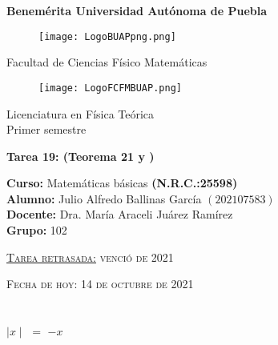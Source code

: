 \documentclass[12pt]{article}
\begin{document}
\pagestyle{empty} 
\setlength{\parindent}{0pt}
\sffamily
\begin{center} \LARGE{\bf Benemérita Universidad Autónoma de Puebla} \\[0.5cm]
\begin{figure}[htb] \centering \texttt{[image: LogoBUAPpng.png]} \end{figure}
\LARGE{Facultad de Ciencias Físico Matemáticas}\\[0.5cm]
\begin{figure}[htb] \centering \texttt{[image: LogoFCFMBUAP.png]} \end{figure} 
\Large{Licenciatura en Física Teórica}\\[0.5cm]
\large{Primer semestre} \end{center}
\begin{center} { \Large \bfseries{Tarea 19}: (Teorema 21 {} y {} )} \\ \end{center}
\large{\bf Curso:} Matemáticas básicas \textbf{(N.R.C.:25598)}\\
\large{\bf Alumno:} Julio Alfredo Ballinas García $\left(202107583\right)$ \\
\large{\bf Docente:} Dra. María Araceli Juárez Ramírez\\
\large{\bf Grupo:} 102\\ \begin{center} 
\vfill
\textsc{\underline{Tarea retrasada:} venció {} de 2021} \end{center}
\begin{center}
\textsc{Fecha de hoy: 14 de octubre de 2021}
\end{center}
\newpage

\section*{}  \vspace{.5cm}

{\LARGE{{} \hspace{.1cm} $\mid x \mid$ $=$ $-x$}} \vspace{.5cm}


{}  \vspace{0.5cm}

{} \vspace{0.5cm} 
\end{document}
